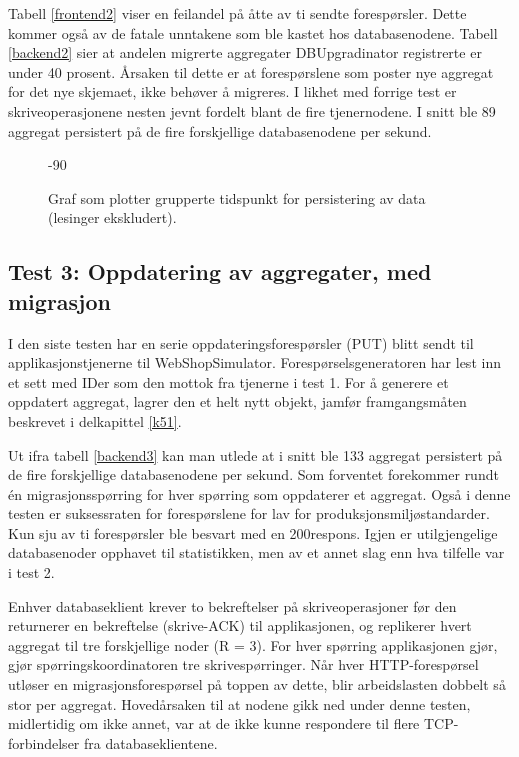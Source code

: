 Tabell \ref{frontend2} viser en feilandel på åtte av ti sendte forespørsler. Dette kommer også av de fatale unntakene som ble kastet hos databasenodene. Tabell \ref{backend2} sier at andelen migrerte aggregater DBUpgradinator registrerte er under 40 prosent. Årsaken til dette er at forespørslene som poster nye aggregat for det nye skjemaet, ikke behøver å migreres. I likhet med forrige test er skriveoperasjonene nesten jevnt fordelt blant de fire tjenernodene. I snitt ble 89 aggregat persistert på de fire forskjellige databasenodene per sekund.

\begin{figure}[hbtp]
  \begin{turn}{-90}
    
  \end{turn}{-90}
  \caption{Graf som plotter grupperte tidspunkt for persistering av data (lesinger ekskludert).}
  \label{plott2}
\end{figure}

\subsection{Test 3: Oppdatering av aggregater, med migrasjon}

I den siste testen har en serie oppdateringsforespørsler (PUT) blitt sendt til applikasjonstjenerne til WebShopSimulator. Forespørsels\-generatoren har lest inn et sett med IDer som den mottok fra tjenerne i test 1. For å generere et oppdatert aggregat, lagrer den et helt nytt objekt, jamfør framgangsmåten beskrevet i delkapittel \ref{k51}.




Ut ifra tabell \ref{backend3} kan man utlede at i snitt ble 133 aggregat persistert på de fire forskjellige databasenodene per sekund. Som forventet forekommer rundt én migrasjonsspørring for hver spørring som oppdaterer et aggregat. Også i denne testen er suksessraten for forespørslene for lav for produksjonsmiljø\-standarder. Kun sju av ti forespørsler ble besvart med en 200\-respons. Igjen er utilgjengelige databasenoder opphavet til statistikken, men av et annet slag enn hva tilfelle var i test 2.

Enhver databaseklient krever to bekreftelser på skriveoperasjoner før den returnerer en bekreftelse (skrive-ACK) til applikasjonen, og replikerer hvert aggregat til tre forskjellige noder (R = 3). For hver spørring applikasjonen gjør, gjør spørringskoordinatoren tre skrivespørringer. Når hver HTTP-forespørsel utløser en migrasjonsforespørsel på toppen av dette, blir arbeidslasten dobbelt så stor per aggregat. Hovedårsaken til at nodene gikk ned under denne testen, midlertidig om ikke annet, var at de ikke kunne respondere til flere TCP-forbindelser fra databaseklientene.

